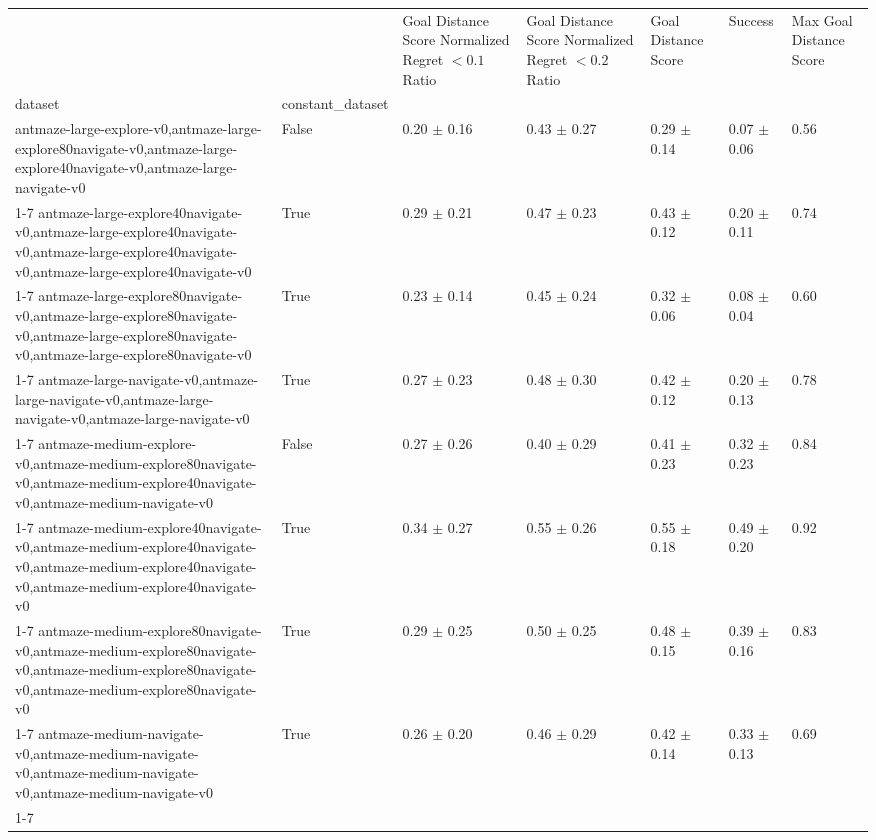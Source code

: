 \begin{tabular}{lllllll}
\toprule
 &  & Goal Distance Score Normalized Regret $< 0.1$ Ratio & Goal Distance Score Normalized Regret $< 0.2$ Ratio & Goal Distance Score & Success & Max Goal Distance Score \\
dataset & constant_dataset &  &  &  &  &  \\
\midrule
antmaze-large-explore-v0,antmaze-large-explore80navigate-v0,antmaze-large-explore40navigate-v0,antmaze-large-navigate-v0 & False & 0.20 $\pm$ 0.16 & 0.43 $\pm$ 0.27 & 0.29 $\pm$ 0.14 & 0.07 $\pm$ 0.06 & 0.56 \\
\cline{1-7}
antmaze-large-explore40navigate-v0,antmaze-large-explore40navigate-v0,antmaze-large-explore40navigate-v0,antmaze-large-explore40navigate-v0 & True & 0.29 $\pm$ 0.21 & 0.47 $\pm$ 0.23 & 0.43 $\pm$ 0.12 & 0.20 $\pm$ 0.11 & 0.74 \\
\cline{1-7}
antmaze-large-explore80navigate-v0,antmaze-large-explore80navigate-v0,antmaze-large-explore80navigate-v0,antmaze-large-explore80navigate-v0 & True & 0.23 $\pm$ 0.14 & 0.45 $\pm$ 0.24 & 0.32 $\pm$ 0.06 & 0.08 $\pm$ 0.04 & 0.60 \\
\cline{1-7}
antmaze-large-navigate-v0,antmaze-large-navigate-v0,antmaze-large-navigate-v0,antmaze-large-navigate-v0 & True & 0.27 $\pm$ 0.23 & 0.48 $\pm$ 0.30 & 0.42 $\pm$ 0.12 & 0.20 $\pm$ 0.13 & 0.78 \\
\cline{1-7}
antmaze-medium-explore-v0,antmaze-medium-explore80navigate-v0,antmaze-medium-explore40navigate-v0,antmaze-medium-navigate-v0 & False & 0.27 $\pm$ 0.26 & 0.40 $\pm$ 0.29 & 0.41 $\pm$ 0.23 & 0.32 $\pm$ 0.23 & 0.84 \\
\cline{1-7}
antmaze-medium-explore40navigate-v0,antmaze-medium-explore40navigate-v0,antmaze-medium-explore40navigate-v0,antmaze-medium-explore40navigate-v0 & True & 0.34 $\pm$ 0.27 & 0.55 $\pm$ 0.26 & 0.55 $\pm$ 0.18 & 0.49 $\pm$ 0.20 & 0.92 \\
\cline{1-7}
antmaze-medium-explore80navigate-v0,antmaze-medium-explore80navigate-v0,antmaze-medium-explore80navigate-v0,antmaze-medium-explore80navigate-v0 & True & 0.29 $\pm$ 0.25 & 0.50 $\pm$ 0.25 & 0.48 $\pm$ 0.15 & 0.39 $\pm$ 0.16 & 0.83 \\
\cline{1-7}
antmaze-medium-navigate-v0,antmaze-medium-navigate-v0,antmaze-medium-navigate-v0,antmaze-medium-navigate-v0 & True & 0.26 $\pm$ 0.20 & 0.46 $\pm$ 0.29 & 0.42 $\pm$ 0.14 & 0.33 $\pm$ 0.13 & 0.69 \\
\cline{1-7}
\bottomrule
\end{tabular}

